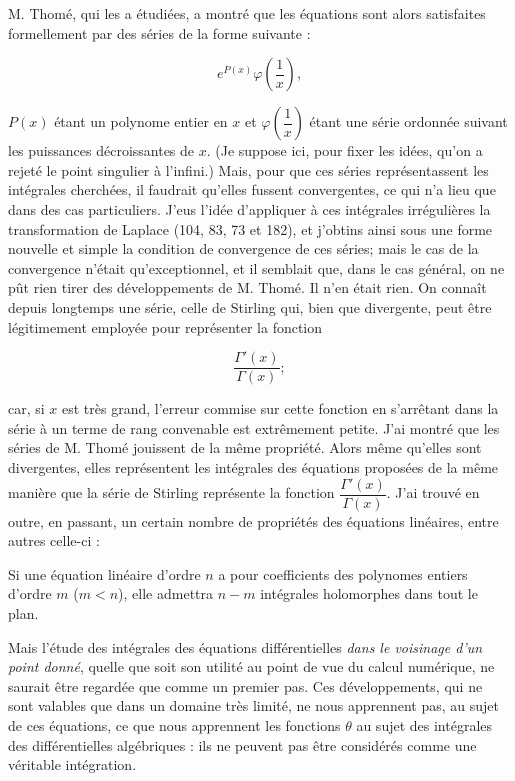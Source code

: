 \documentclass[11pt]{article}
\begin{document}
M. Thomé, qui les a étudiées, a montré que les équations sont alors satisfaites formellement par des séries de la forme suivante :

\[
e^{P(x)}\varphi\!\left(\frac{1}{x}\right),
\]

$P(x)$ étant un polynome entier en $x$ et $\varphi\!\left(\dfrac{1}{x}\right)$ étant une série ordonnée suivant les puissances décroissantes de $x$. (Je suppose ici, pour fixer les idées, qu’on a rejeté le point singulier à l’infini.) Mais, pour que ces séries représentassent les intégrales cherchées, il faudrait qu’elles fussent convergentes, ce qui n’a lieu que dans des cas particuliers. J’eus l’idée d’appliquer à ces intégrales irrégulières la transformation de Laplace (104, 83, 73 et 182), et j’obtins ainsi sous une forme nouvelle et simple la condition de convergence de ces séries; mais le cas de la convergence n’était qu’exceptionnel, et il semblait que, dans le cas général, on ne pût rien tirer des développements de M. Thomé. Il n’en était rien. On connaît depuis longtemps une série, celle de Stirling qui, bien que divergente, peut être légitimement employée pour représenter la fonction

\[
\frac{\Gamma'(x)}{\Gamma(x)};
\]

car, si $x$ est très grand, l’erreur commise sur cette fonction en s’arrêtant dans la série à un terme de rang convenable est extrêmement petite. J’ai montré que les séries de M. Thomé jouissent de la même propriété. Alors même qu’elles sont divergentes, elles représentent les intégrales des équations proposées de la même manière que la série de Stirling représente la fonction $\dfrac{\Gamma'(x)}{\Gamma(x)}$. J’ai trouvé en outre, en passant, un certain nombre de propriétés des équations linéaires, entre autres celle-ci :

Si une équation linéaire d’ordre $n$ a pour coefficients des polynomes entiers d’ordre $m$ ($m<n$), elle admettra $n-m$ intégrales holomorphes dans tout le plan.

Mais l’étude des intégrales des équations différentielles \emph{dans le voisinage d’un point donné}, quelle que soit son utilité au point de vue du calcul numérique, ne saurait être regardée que comme un premier pas. Ces développements, qui ne sont valables que dans un domaine très limité, ne nous apprennent pas, au sujet de ces équations, ce que nous apprennent les fonctions $\theta$ au sujet des intégrales des différentielles algébriques : ils ne peuvent pas être considérés comme une véritable intégration.
\end{document}
